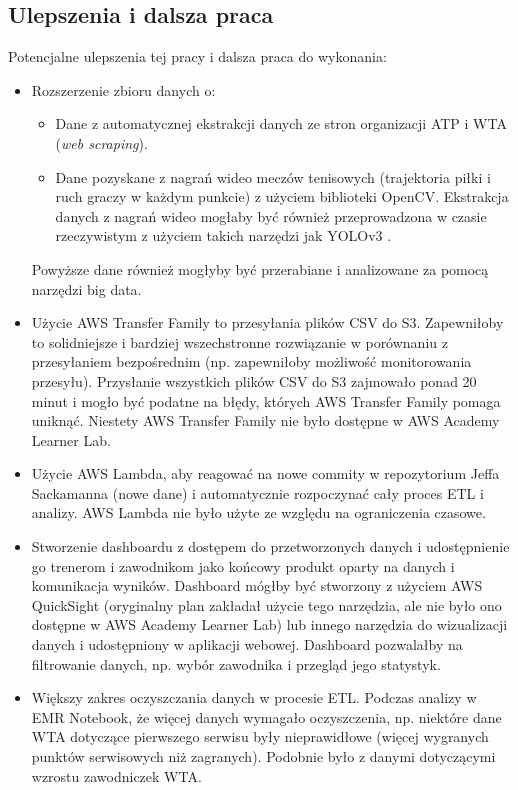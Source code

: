 \documentclass[12pt, a4paper]{article}
\begin{document}
\subsection{Ulepszenia i dalsza praca}
Potencjalne ulepszenia tej pracy i dalsza praca do wykonania:
\begin{itemize}
    \item Rozszerzenie zbioru danych o:
    \begin{itemize}
        \item Dane z automatycznej ekstrakcji danych ze stron organizacji ATP i WTA (\textit{web scraping}).
        \item Dane pozyskane z nagrań wideo meczów tenisowych (trajektoria piłki i ruch graczy w każdym punkcie) z użyciem biblioteki OpenCV. Ekstrakcja danych z nagrań wideo mogłaby być również przeprowadzona w czasie rzeczywistym z użyciem takich narzędzi jak YOLOv3 \cite{yolo_v3}.
    \end{itemize}
    Powyższe dane również mogłyby być przerabiane i analizowane za pomocą narzędzi big data.
    \item Użycie AWS Transfer Family to przesyłania plików CSV do S3. Zapewniłoby to solidniejsze i bardziej wszechstronne rozwiązanie w porównaniu z przesyłaniem bezpośrednim (np. zapewniłoby możliwość monitorowania przesyłu). Przysłanie wszystkich plików CSV do S3 zajmowało ponad 20 minut i mogło być podatne na błędy, których AWS Transfer Family pomaga uniknąć. Niestety AWS Transfer Family nie było dostępne w AWS Academy Learner Lab.
    \item Użycie AWS Lambda, aby reagować na nowe commity w repozytorium Jeffa Sackamanna (nowe dane) i automatycznie rozpoczynać cały proces ETL i analizy. AWS Lambda nie było użyte ze względu na ograniczenia czasowe.
    \item Stworzenie dashboardu z dostępem do przetworzonych danych i udostępnienie go trenerom i zawodnikom jako końcowy produkt oparty na danych i komunikacja wyników. Dashboard mógłby być stworzony z użyciem AWS QuickSight (oryginalny plan zakładał użycie tego narzędzia, ale nie było ono dostępne w AWS Academy Learner Lab) lub innego narzędzia do wizualizacji danych i udostępniony w aplikacji webowej. Dashboard pozwalałby na filtrowanie danych, np. wybór zawodnika i przegląd jego statystyk.
    \item Większy zakres oczyszczania danych w procesie ETL. Podczas analizy w EMR Notebook, że więcej danych wymagało oczyszczenia, np. niektóre dane WTA dotyczące pierwszego serwisu były nieprawidłowe (więcej wygranych punktów serwisowych niż zagranych). Podobnie było z danymi dotyczącymi wzrostu zawodniczek WTA.

\end{itemize}
\end{document}
